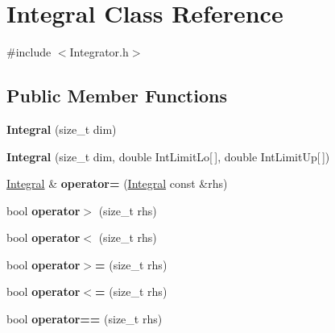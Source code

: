 \hypertarget{classIntegral}{\section{Integral Class Reference}
\label{classIntegral}
}


{\ttfamily \#include $<$Integrator.\-h$>$}

\subsection*{Public Member Functions}
\begin{DoxyCompactItemize}
\item 
\hypertarget{classIntegral_a958228701e11668d62cb716a794627ae}{{\bfseries Integral} (size\-\_\-t dim)}\label{classIntegral_a958228701e11668d62cb716a794627ae}

\item 
\hypertarget{classIntegral_af859a39ddd8447a08351b2185b4fa4dc}{{\bfseries Integral} (size\-\_\-t dim, double Int\-Limit\-Lo\mbox{[}$\,$\mbox{]}, double Int\-Limit\-Up\mbox{[}$\,$\mbox{]})}\label{classIntegral_af859a39ddd8447a08351b2185b4fa4dc}

\item 
\hypertarget{classIntegral_af89fcd97e32bbacc527b3f5002498d52}{\hyperlink{classIntegral}{Integral} \& {\bfseries operator=} (\hyperlink{classIntegral}{Integral} const \&rhs)}\label{classIntegral_af89fcd97e32bbacc527b3f5002498d52}

\item 
\hypertarget{classIntegral_a22bfa4c5fcccc8921f314a0594d10273}{bool {\bfseries operator$>$} (size\-\_\-t rhs)}\label{classIntegral_a22bfa4c5fcccc8921f314a0594d10273}

\item 
\hypertarget{classIntegral_a17a701ae693301d53924c0f093e9348e}{bool {\bfseries operator$<$} (size\-\_\-t rhs)}\label{classIntegral_a17a701ae693301d53924c0f093e9348e}

\item 
\hypertarget{classIntegral_afaad3e58d70d8714d47667218fd0b2b2}{bool {\bfseries operator$>$=} (size\-\_\-t rhs)}\label{classIntegral_afaad3e58d70d8714d47667218fd0b2b2}

\item 
\hypertarget{classIntegral_a391da51e4234f840797230301e914c59}{bool {\bfseries operator$<$=} (size\-\_\-t rhs)}\label{classIntegral_a391da51e4234f840797230301e914c59}

\item 
\hypertarget{classIntegral_a114cf52f7967e3595d92f1e3c0bc4681}{bool {\bfseries operator==} (size\-\_\-t rhs)}\label{classIntegral_a114cf52f7967e3595d92f1e3c0bc4681}


\end{DoxyCompactItemize}
